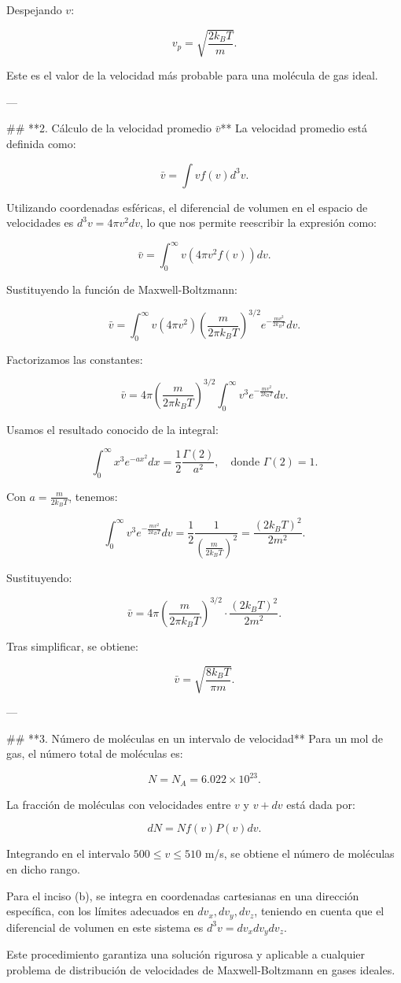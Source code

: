 Despejando \( v \):

\[
v_p = \sqrt{\frac{2 k_B T}{m}}.
\]

Este es el valor de la velocidad más probable para una molécula de gas ideal.

---

## **2. Cálculo de la velocidad promedio \( \bar{v} \)**
La velocidad promedio está definida como:

\[
\bar{v} = \int v f(v) d^3v.
\]

Utilizando coordenadas esféricas, el diferencial de volumen en el espacio de velocidades es \( d^3v = 4\pi v^2 dv \), lo que nos permite reescribir la expresión como:

\[
\bar{v} = \int_0^\infty v (4\pi v^2 f(v)) dv.
\]

Sustituyendo la función de Maxwell-Boltzmann:

\[
\bar{v} = \int_0^\infty v (4\pi v^2) \left( \frac{m}{2\pi k_B T} \right)^{3/2} e^{- \frac{m v^2}{2 k_B T}} dv.
\]

Factorizamos las constantes:

\[
\bar{v} = 4\pi \left( \frac{m}{2\pi k_B T} \right)^{3/2} \int_0^\infty v^3 e^{- \frac{m v^2}{2 k_B T}} dv.
\]

Usamos el resultado conocido de la integral:

\[
\int_0^\infty x^3 e^{-a x^2} dx = \frac{1}{2} \frac{\Gamma(2)}{a^2}, \quad \text{donde } \Gamma(2) = 1.
\]

Con \( a = \frac{m}{2 k_B T} \), tenemos:

\[
\int_0^\infty v^3 e^{- \frac{m v^2}{2 k_B T}} dv = \frac{1}{2} \frac{1}{\left( \frac{m}{2 k_B T} \right)^2} = \frac{(2 k_B T)^2}{2 m^2}.
\]

Sustituyendo:

\[
\bar{v} = 4\pi \left( \frac{m}{2\pi k_B T} \right)^{3/2} \cdot \frac{(2 k_B T)^2}{2 m^2}.
\]

Tras simplificar, se obtiene:

\[
\bar{v} = \sqrt{\frac{8 k_B T}{\pi m}}.
\]

---

## **3. Número de moléculas en un intervalo de velocidad**
Para un mol de gas, el número total de moléculas es:

\[
N = N_A = 6.022 \times 10^{23}.
\]

La fracción de moléculas con velocidades entre \( v \) y \( v + dv \) está dada por:

\[
dN = N f(v) P(v) dv.
\]

Integrando en el intervalo \( 500 \leq v \leq 510 \) m/s, se obtiene el número de moléculas en dicho rango. 

Para el inciso (b), se integra en coordenadas cartesianas en una dirección específica, con los límites adecuados en \( dv_x, dv_y, dv_z \), teniendo en cuenta que el diferencial de volumen en este sistema es \( d^3v = dv_x dv_y dv_z \).

Este procedimiento garantiza una solución rigurosa y aplicable a cualquier problema de distribución de velocidades de Maxwell-Boltzmann en gases ideales.